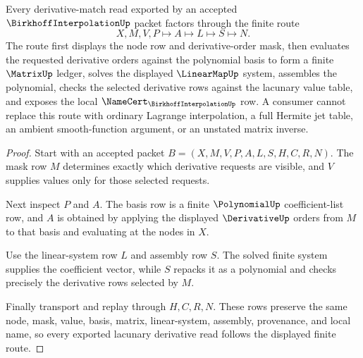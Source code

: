 \begin{theorem}
\label{thm:birkhoff-interpolation-lacunary-derivative-route}
Every derivative-match read exported by an accepted $\BirkhoffInterpolationUp$ packet factors through the finite route
$$
X,M,V,P \longmapsto A \longmapsto L \longmapsto S \longmapsto N .
$$
The route first displays the node row and derivative-order mask, then evaluates the requested derivative orders against the polynomial basis to form a finite $\MatrixUp$ ledger, solves the displayed $\LinearMapUp$ system, assembles the polynomial, checks the selected derivative rows against the lacunary value table, and exposes the local $\NameCert_{\BirkhoffInterpolationUp}$ row. A consumer cannot replace this route with ordinary Lagrange interpolation, a full Hermite jet table, an ambient smooth-function argument, or an unstated matrix inverse.
\end{theorem}
\begin{proof}
Start with an accepted packet $B=(X,M,V,P,A,L,S,H,C,R,N)$. The mask row $M$ determines exactly which derivative requests are visible, and $V$ supplies values only for those selected requests.

Next inspect $P$ and $A$. The basis row is a finite $\PolynomialUp$ coefficient-list row, and $A$ is obtained by applying the displayed $\DerivativeUp$ orders from $M$ to that basis and evaluating at the nodes in $X$.

Use the linear-system row $L$ and assembly row $S$. The solved finite system supplies the coefficient vector, while $S$ repacks it as a polynomial and checks precisely the derivative rows selected by $M$.

Finally transport and replay through $H,C,R,N$. These rows preserve the same node, mask, value, basis, matrix, linear-system, assembly, provenance, and local name, so every exported lacunary derivative read follows the displayed finite route.
\end{proof}



